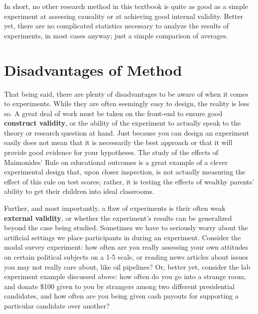 \documentclass{book}
\begin{document}
In short, no other research method in this textbook is quite as good as a
simple experiment at assessing causality or at achieving good internal
validity. Better yet, there are no complicated statistics necessary to analyze
the results of experiments, in most cases anyway; just a simple comparison of
averages.

\hypertarget{disadvantages-of-method}{%
\section{Disadvantages of Method}\label{disadvantages-of-method}}

That being said, there are plenty of disadvantages to be aware of when it
comes to experiments. While they are often seemingly easy to design, the
reality is less so. A great deal of work must be taken on the front-end to
ensure good \textbf{construct validity}, or the ability of the experiment to
actually speak to the theory or research question at hand. Just because you
can design an experiment easily does not mean that it is necessarily the best
approach or that it will provide good evidence for your hypotheses. The study
of the effects of Maimonides' Rule on educational outcomes is a great example
of a clever experimental design that, upon closer inspection, is not actually
measuring the effect of this rule on test scores; rather, it is testing the
effects of wealthy parents' ability to get their children into ideal
classrooms.

Further, and most importantly, a flaw of experiments is their often weak
\textbf{external validity}, or whether the experiment's results can be
generalized beyond the case being studied. Sometimes we have to seriously
worry about the artificial settings we place participants in during an
experiment. Consider the modal survey experiment: how often are you really
assessing your own attitudes on certain political subjects on a 1-5 scale, or
reading news articles about issues you may not really care about, like oil
pipelines? Or, better yet, consider the lab experiment example discussed
above: how often do you go into a strange room, and donate \$100 given to you
by strangers among two different presidential candidates, and how often are
you being given cash payouts for supporting a particular candidate over
another?
\end{document}
